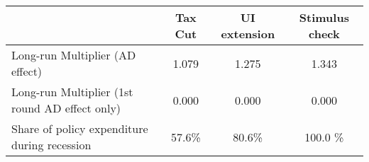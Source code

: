 \begin{tabular}{@{}lccc@{}} 
\toprule 
& Tax Cut    & UI extension    & Stimulus check    \\  \midrule 
Long-run Multiplier (AD effect) &1.079  & 1.275  & 1.343     \\ 
Long-run Multiplier (1st round AD effect only) &0.000  & 0.000  & 0.000     \\ 
Share of policy expenditure during recession &57.6\%  & 80.6\%  & 100.0 \%    \\ 
\end{tabular}  
